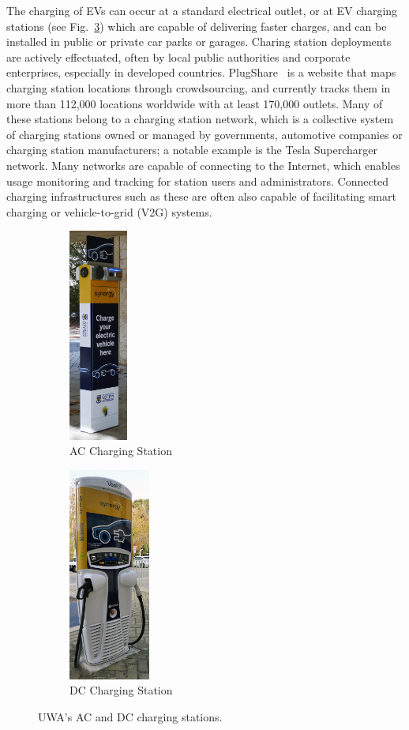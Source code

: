 The charging of EVs can occur at a standard electrical outlet, or at EV charging stations (see Fig.~\ref{fig:1:cs}) which are capable of delivering faster charges, and can be installed in public or private car parks or garages. Charing station deployments are actively effectuated, often by local public authorities and corporate enterprises, especially in developed countries. PlugShare~\cite{plugshare_plugshare_nodate} is a website that maps charging station locations through crowdsourcing, and currently tracks them in more than 112,000 locations worldwide with at least 170,000 outlets. Many of these stations belong to a charging station network, which is a collective system of charging stations owned or managed by governments, automotive companies or charging station manufacturers; a notable example is the Tesla Supercharger~\cite{tesla_supercharger_nodate} network. Many networks are capable of connecting to the Internet, which enables usage monitoring and tracking for station users and administrators. Connected charging infrastructures such as these are often also capable of facilitating smart charging or vehicle-to-grid (V2G) systems. 

\begin{figure}[ht]
	\centering
	\begin{subfigure}[b]{0.45\textwidth}
		\centering
		\includegraphics[height=7cm]{accs}
		\caption{AC Charging Station}
		\label{fig:1:accs}   
	\end{subfigure} 
	\hspace{1em}         
	\begin{subfigure}[b]{0.45\textwidth}
		\centering
		\includegraphics[height=7cm]{dccs}
		\caption{DC Charging Station}
		\label{fig:1:dccs}
	\end{subfigure}             
	\caption{UWA's AC and DC charging stations.}
	\label{fig:1:cs}
\end{figure}

